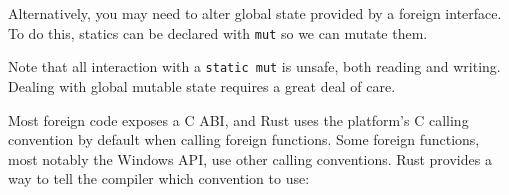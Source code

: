 \documentclass[a4paper,]{book}
\newenvironment{Shaded}{\begin{snugshade}}{\end{snugshade}}
\newcommand{\KeywordTok}[1]{\textcolor[rgb]{0.13,0.29,0.53}{\textbf{{#1}}}}
\newcommand{\DataTypeTok}[1]{\textcolor[rgb]{0.13,0.29,0.53}{{#1}}}
\newcommand{\StringTok}[1]{\textcolor[rgb]{0.31,0.60,0.02}{{#1}}}
\newcommand{\PreprocessorTok}[1]{\textcolor[rgb]{0.56,0.35,0.01}{\textit{{#1}}}}
\newcommand{\AttributeTok}[1]{\textcolor[rgb]{0.77,0.63,0.00}{{#1}}}
\newcommand{\NormalTok}[1]{{#1}}
\begin{document}
Alternatively, you may need to alter global state provided by a foreign
interface. To do this, statics can be declared with \texttt{mut} so we
can mutate them.

\begin{Shaded}
\end{Shaded}

Note that all interaction with a \texttt{static\ mut} is unsafe, both
reading and writing. Dealing with global mutable state requires a great
deal of care.


Most foreign code exposes a C ABI, and Rust uses the platform's C
calling convention by default when calling foreign functions. Some
foreign functions, most notably the Windows API, use other calling
conventions. Rust provides a way to tell the compiler which convention
to use:
\end{document}
